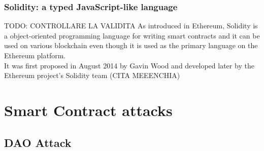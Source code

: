 \subsubsection{Solidity: a typed JavaScript-like language}
TODO: CONTROLLARE LA VALIDITA 
As introduced in Ethereum, Solidity is a object-oriented programming language for writing smart contracts and it can be used on various blockchain even though it is used as the primary language on the Ethereum platform.
\\It was first proposed in August 2014 by Gavin Wood and developed later by the Ethereum project's Solidity team (CITA MEEENCHIA)

\section{Smart Contract attacks}
\subsection{DAO Attack}
